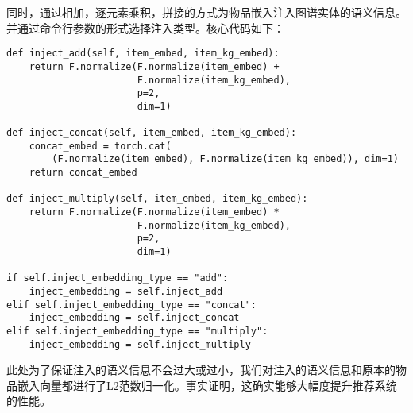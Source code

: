 \documentclass{ctexart}
\begin{document}
\begin{sloppypar}
    同时，通过相加，逐元素乘积，拼接的方式为物品嵌入注入图谱实体的语义信息。并通过命令行参数的形式选择注入类型。核心代码如下：

    \begin{lstlisting}[style=python]        
def inject_add(self, item_embed, item_kg_embed):
    return F.normalize(F.normalize(item_embed) +
                       F.normalize(item_kg_embed),
                       p=2,
                       dim=1)

def inject_concat(self, item_embed, item_kg_embed):
    concat_embed = torch.cat(
        (F.normalize(item_embed), F.normalize(item_kg_embed)), dim=1)
    return concat_embed

def inject_multiply(self, item_embed, item_kg_embed):
    return F.normalize(F.normalize(item_embed) *
                       F.normalize(item_kg_embed),
                       p=2,
                       dim=1)

if self.inject_embedding_type == "add":
    inject_embedding = self.inject_add
elif self.inject_embedding_type == "concat":
    inject_embedding = self.inject_concat
elif self.inject_embedding_type == "multiply":
    inject_embedding = self.inject_multiply

    \end{lstlisting}

    此处为了保证注入的语义信息不会过大或过小，我们对注入的语义信息和原本的物品嵌入向量都进行了L2范数归一化。事实证明，这确实能够大幅度提升推荐系统的性能。


\end{sloppypar}
\end{document}
